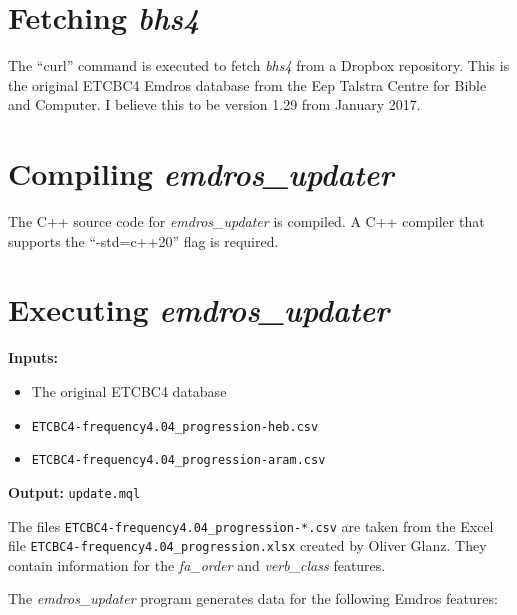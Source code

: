 \documentclass[11pt,oneside,a4paper,article]{memoir}
\begin{document}
\section{Fetching \emph{bhs4}}

The ``curl'' command is executed to fetch \emph{bhs4} from a Dropbox repository. This is the
original ETCBC4 Emdros database from the Eep Talstra Centre for Bible and Computer. I believe this
to be version 1.29 from January 2017.

\section{Compiling \emph{emdros\_updater}}

The C++ source code for \emph{emdros\_updater} is compiled. A C++ compiler that supports the
``-std=c++20'' flag is required.

\section{Executing \emph{emdros\_updater}}

\noindent \textbf{Inputs:}
\begin{itemize}
\item The original ETCBC4 database
\item \texttt{ETCBC4-frequency4.04\_progression-heb.csv}
\item \texttt{ETCBC4-frequency4.04\_progression-aram.csv}
\end{itemize}

\noindent \textbf{Output:} \texttt{update.mql}

\vspace{1ex}

The files \texttt{ETCBC4-frequency4.04\_progression-*.csv} are taken from the Excel file
\texttt{ETCBC4-frequency4.04\_progression.xlsx} created by Oliver Glanz. They contain information
for the \emph{fa\_order} and \emph{verb\_class} features.

The \emph{emdros\_updater} program generates data for the following Emdros features:
\end{document}
